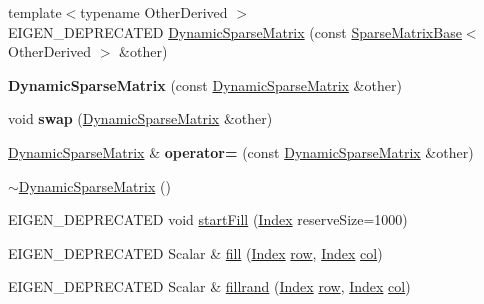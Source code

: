 \begin{DoxyCompactItemize}
\item 
{\footnotesize template$<$typename Other\+Derived $>$ }\\E\+I\+G\+E\+N\+\_\+\+D\+E\+P\+R\+E\+C\+A\+T\+ED \hyperlink{class_eigen_1_1_dynamic_sparse_matrix_ab5bd886d79beb30802df0b1508727482}{Dynamic\+Sparse\+Matrix} (const \hyperlink{group___sparse_core___module_class_eigen_1_1_sparse_matrix_base}{Sparse\+Matrix\+Base}$<$ Other\+Derived $>$ \&other)
\item 
\mbox{\label{class_eigen_1_1_dynamic_sparse_matrix_a61c416ffa2661d1d3db47d61c3a04bcf}} 
{\bfseries Dynamic\+Sparse\+Matrix} (const \hyperlink{class_eigen_1_1_dynamic_sparse_matrix}{Dynamic\+Sparse\+Matrix} \&other)
\item 
\mbox{\label{class_eigen_1_1_dynamic_sparse_matrix_a46c0e8a2c68d24eef495e833802a90b3}} 
void {\bfseries swap} (\hyperlink{class_eigen_1_1_dynamic_sparse_matrix}{Dynamic\+Sparse\+Matrix} \&other)
\item 
\mbox{\label{class_eigen_1_1_dynamic_sparse_matrix_a12fab494d7e774126fca5d0cd6e82851}} 
\hyperlink{class_eigen_1_1_dynamic_sparse_matrix}{Dynamic\+Sparse\+Matrix} \& {\bfseries operator=} (const \hyperlink{class_eigen_1_1_dynamic_sparse_matrix}{Dynamic\+Sparse\+Matrix} \&other)
\item 
\hyperlink{class_eigen_1_1_dynamic_sparse_matrix_af0677c8aec1e1dee9f0a389509082a83}{$\sim$\+Dynamic\+Sparse\+Matrix} ()
\item 
E\+I\+G\+E\+N\+\_\+\+D\+E\+P\+R\+E\+C\+A\+T\+ED void \hyperlink{class_eigen_1_1_dynamic_sparse_matrix_abade0bf46139d8577aa24ead30c76771}{start\+Fill} (\hyperlink{group___core___module_a554f30542cc2316add4b1ea0a492ff02}{Index} reserve\+Size=1000)
\item 
E\+I\+G\+E\+N\+\_\+\+D\+E\+P\+R\+E\+C\+A\+T\+ED Scalar \& \hyperlink{class_eigen_1_1_dynamic_sparse_matrix_a70c8f529b38fd5b7d93d6dfe1a122723}{fill} (\hyperlink{group___core___module_a554f30542cc2316add4b1ea0a492ff02}{Index} \hyperlink{group___sparse_core___module_ac0a5563ed3f243f013fb9d2c17e230d0}{row}, \hyperlink{group___core___module_a554f30542cc2316add4b1ea0a492ff02}{Index} \hyperlink{group___sparse_core___module_a8f4eaa3c3921ef3823ffc69ebcc356af}{col})
\item 
E\+I\+G\+E\+N\+\_\+\+D\+E\+P\+R\+E\+C\+A\+T\+ED Scalar \& \hyperlink{class_eigen_1_1_dynamic_sparse_matrix_a6a5eb3c9d153d8ebdf4e0967321108e2}{fillrand} (\hyperlink{group___core___module_a554f30542cc2316add4b1ea0a492ff02}{Index} \hyperlink{group___sparse_core___module_ac0a5563ed3f243f013fb9d2c17e230d0}{row}, \hyperlink{group___core___module_a554f30542cc2316add4b1ea0a492ff02}{Index} \hyperlink{group___sparse_core___module_a8f4eaa3c3921ef3823ffc69ebcc356af}{col})

\end{DoxyCompactItemize}

